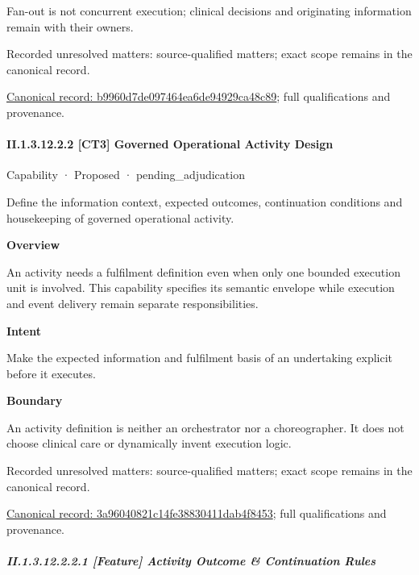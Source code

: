 Fan-out is not concurrent execution; clinical decisions and originating information remain with their owners.


{\small Recorded unresolved matters: source-qualified matters; exact scope remains in the canonical record.}\par
{\footnotesize \href{../../../../continuum/strategy/capability/feature/b9960d7de097464ea6de94929ca48c89.md}{Canonical record: b9960d7de097464ea6de94929ca48c89}; full qualifications and provenance.}\par
\paragraph*{II.1.3.12.2.2 [CT3] Governed Operational Activity Design}
\label{navigation:II.1.3.12.2.2}

\label{element:3a96040821c14fe38830411dab4f8453}
{\small Capability · Proposed · pending\_adjudication}\par

Define the information context, expected outcomes, continuation conditions and housekeeping of governed operational activity.



\textbf{Overview}



An activity needs a fulfilment definition even when only one bounded execution unit is involved. This capability specifies its semantic envelope while execution and event delivery remain separate responsibilities.



\textbf{Intent}



Make the expected information and fulfilment basis of an undertaking explicit before it executes.



\textbf{Boundary}



An activity definition is neither an orchestrator nor a choreographer. It does not choose clinical care or dynamically invent execution logic.


{\small Recorded unresolved matters: source-qualified matters; exact scope remains in the canonical record.}\par
{\footnotesize \href{../../../../continuum/strategy/capability/3a96040821c14fe38830411dab4f8453.md}{Canonical record: 3a96040821c14fe38830411dab4f8453}; full qualifications and provenance.}\par
\subparagraph*{II.1.3.12.2.2.1 [Feature] Activity Outcome \& Continuation Rules}
\label{navigation:II.1.3.12.2.2.1}

